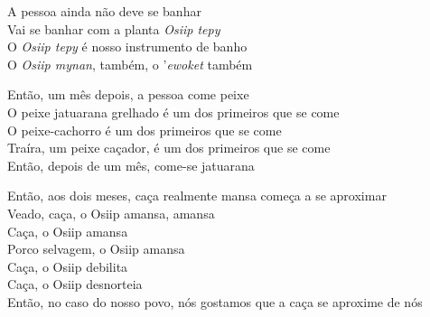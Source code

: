  \smallskip
 \begin{center}\end{center}
 \smallskip
 
\noindent A pessoa ainda não deve se banhar\\
 Vai se banhar com a planta \textit{Osiip tepy}\\
 O \textit{Osiip tepy} é nosso instrumento de banho\\
 O \textit{Osiip mynan}, também, o '\textit{ewoket} também
 
 \smallskip
 \begin{center}\end{center}
 \smallskip
 
\noindent Então, um mês depois, a pessoa come peixe\\
 O peixe jatuarana grelhado é um dos primeiros que se come\\
 O peixe-cachorro é um dos primeiros que se come\\
 Traíra, um peixe caçador, é um dos primeiros que se come\\
 Então, depois de um mês, come-se jatuarana
 
 \smallskip
 \begin{center}\end{center}
 \smallskip
 
\noindent Então, aos dois meses, caça realmente mansa começa a se aproximar\\
 Veado, caça, o Osiip amansa, amansa\\
 Caça, o Osiip amansa\\
 Porco selvagem, o Osiip amansa\\
 Caça, o Osiip debilita\\
 Caça, o Osiip desnorteia\\
 Então, no caso do nosso povo, nós gostamos que a caça se aproxime de nós
 
